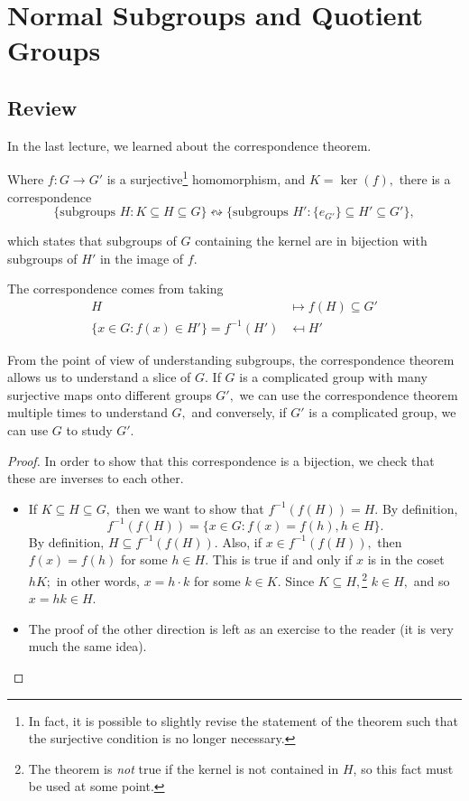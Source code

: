 
\section{Normal Subgroups and Quotient Groups}
\subsection{Review}
In the last lecture, we learned about the correspondence theorem. 

\begin{theorem}
Where $f: G \rightarrow G'$ is a surjective\footnote{In fact, it is possible to slightly revise the statement of the theorem such that the surjective condition is no longer necessary.} homomorphism, and $K = \ker(f),$ there is a correspondence 
\[
\{\text{subgroups } H: K \subseteq H \subseteq G\} \leftrightsquigarrow \{\text{subgroups } H' : \{e_{G'}\} \subseteq H' \subseteq G'\},
\]

which states that subgroups of $G$ containing the kernel are in bijection with subgroups of $H'$ in the image of $f.$
\end{theorem}

The correspondence comes from taking 
\begin{align*}
H &\mapsto f(H) \subseteq G' \\
\{x \in G : f(x) \in H'\} = f^{-1}(H') &\mapsfrom H'
\end{align*}

From the point of view of understanding subgroups, the correspondence theorem allows us to understand a slice of $G.$ If $G$ is a complicated group with many surjective maps onto different groups $G',$ we can use the correspondence theorem multiple times to understand $G,$ and conversely, if $G'$ is a complicated group, we can use $G$ to study $G'.$ 

\begin{proof}
In order to show that this correspondence is a bijection, we check that these are inverses to each other. 
\begin{itemize}
    \item If $K \subseteq H \subseteq G,$ then we want to show that $f^{-1}(f(H)) = H.$ By definition, 
    \[ 
    f^{-1}(f(H)) = \{x \in G : f(x) = f(h), h \in H\}.
    \]
    By definition, $H \subseteq f^{-1}(f(H)).$ Also, if $x \in f^{-1}(f(H)),$ then $f(x) = f(h)$ for some $h \in H.$ This is true if and only if $x$ is in the coset $hK;$ in other words, $x = h\cdot k$ for some $k \in K.$ Since $K \subseteq H,$\footnote{The theorem is \emph{not} true if the kernel is not contained in $H$, so this fact must be used at some point.} $k \in H,$ and so $x = hk \in H.$ 
    \item The proof of the other direction is left as an exercise to the reader (it is very much the same idea).  
\end{itemize}
\end{proof}


